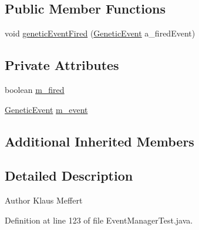\subsection*{Public Member Functions}
\begin{DoxyCompactItemize}
\item 
void \hyperlink{classorg_1_1jgap_1_1event_1_1_event_manager_test_1_1_event_listener_a4f0a069aa11cd00c4d7df8ccf395db39}{genetic\-Event\-Fired} (\hyperlink{classorg_1_1jgap_1_1event_1_1_genetic_event}{Genetic\-Event} a\-\_\-fired\-Event)
\end{DoxyCompactItemize}
\subsection*{Private Attributes}
\begin{DoxyCompactItemize}
\item 
boolean \hyperlink{classorg_1_1jgap_1_1event_1_1_event_manager_test_1_1_event_listener_aa9d30d6fa9ef86081940b9733f8b10e5}{m\-\_\-fired}
\item 
\hyperlink{classorg_1_1jgap_1_1event_1_1_genetic_event}{Genetic\-Event} \hyperlink{classorg_1_1jgap_1_1event_1_1_event_manager_test_1_1_event_listener_aabba2d6e914197bff4a6cc283f78bcd8}{m\-\_\-event}
\end{DoxyCompactItemize}
\subsection*{Additional Inherited Members}


\subsection{Detailed Description}
\begin{DoxyAuthor}{Author}
Klaus Meffert 
\end{DoxyAuthor}


Definition at line 123 of file Event\-Manager\-Test.\-java.



